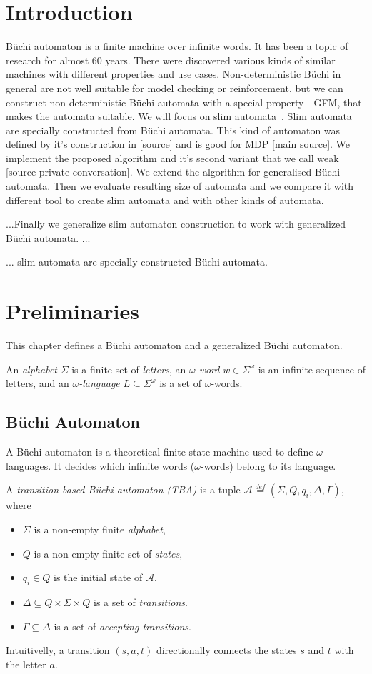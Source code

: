 \documentclass[
	digital
nolof, nolot
]{fithesis3}
\newcommand{\cA}{\mathcal{A}}
\newcommand{\eqdef}{\overset{def}{=}}
\begin{document}
	\chapter{Introduction}
	Büchi automaton is a finite machine over infinite words. It has been a topic of research for almost 60 years.
	There were discovered various kinds of similar machines with different properties and use cases.
	Non-deterministic Büchi in general are not well suitable for model checking or reinforcement, but we can construct non-deterministic Büchi automata with a special property - GFM, that makes the automata suitable. We will focus on slim automata~\cite{hlavni}.
	Slim automata are specially constructed from Büchi automata. This kind of automaton was defined by it's construction in [source] and is good for MDP [main source]. We implement the proposed algorithm and it's second variant that we call weak [source private conversation]. We extend the algorithm for generalised Büchi automata. Then we evaluate resulting size of automata and we compare it with different tool to create slim automata and with other kinds of automata.
	
	
	...Finally we generalize slim automaton construction to work with generalized Büchi automata. ...
	
	... slim automata are specially constructed Büchi automata.
	\chapter{Preliminaries}
		This chapter defines a Büchi automaton and a generalized Büchi automaton. 
		
		
		An \emph{alphabet} $\Sigma$  is a finite set of \emph{letters}, an \emph{$\omega$-word} $w \in \Sigma^\omega$ is an infinite sequence of letters, and an \emph{$\omega$-language} $L \subseteq \Sigma^\omega$ is a set of $\omega$-words.
		\section{Büchi Automaton} \label{section:tba}
			A Büchi automaton is a theoretical finite-state machine used to define $\omega$-languages. It decides which infinite words ($\omega$-words) belong to its language.
			
			A \emph{transition-based Büchi automaton (TBA)} is a tuple $\cA\eqdef(\Sigma, Q, q_i, \Delta, \Gamma)$, where 
			\begin{itemize}
				\item $\Sigma$ is a non-empty finite \emph{alphabet},
				\item $Q$ is a non-empty finite set of \emph{states},
				\item $q_i \in Q$ is the initial state of $\cA$.
				\item $\Delta \subseteq Q \times \Sigma \times Q$ is a set of \emph{transitions}. 
				\item $\Gamma \subseteq \Delta$ is a set of \emph{accepting transitions}.
			\end{itemize}
			 Intuitivelly, a transition $(s, a, t)$  directionally connects the states $s$ and $t$ with the letter $a$.
			 
\end{document}
